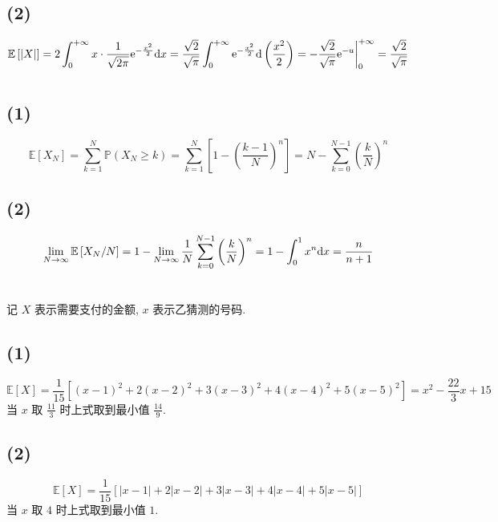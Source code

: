 \documentclass[8pt]{article}
\theoremstyle{compact}
\def\ge{\geqslant}
\def\P#1{\mathbb{P}\left({#1}\right)}
\def\e{\mathrm{e}}
\def\E#1{\mathbb{E}\left[{#1}\right]}
\begin{document}
\subsection*{(2)}
\begin{equation*}
	\E{|X|} = 2\int_{0}^{+\infty}x\cdot\frac{1}{\sqrt{2\pi}}\e^{-\frac{x^2}{2}}\text dx = \frac{\sqrt2}{\sqrt{\pi}}\int_{0}^{+\infty}\e^{-\frac{x^2}{2}}\text d\left(\frac{x^2}2\right) = -\frac{\sqrt2}{\sqrt{\pi}}\e^{-u}\bigg|_0^{+\infty} = \frac{\sqrt2}{\sqrt{\pi}}
\end{equation*}
\section{}
\subsection*{(1)}
\begin{equation*}
	\E{X_N} = \sum_{k=1}^{N}\P{X_N \ge k} = \sum_{k=1}^{N}\left[1 - \left(\frac {k-1}N\right)^n\right] = N - \sum_{k=0}^{N-1}\left(\frac kN\right)^n
\end{equation*}
\subsection*{(2)}
\begin{equation*}
	\lim_{N \to \infty}\E{X_N / N} = 1 - \lim_{N \to \infty}\frac1N\sum_{k=0}^{N-1}\left(\frac kN\right)^n = 1 - \int_{0}^{1}x^n\text dx = \frac{n}{n+1}
\end{equation*}
\section{}
记 $X$ 表示需要支付的金额, $x$ 表示乙猜测的号码.
\subsection*{(1)}
\begin{equation*}
	\E{X} = \frac{1}{15}\left[(x - 1)^2 + 2(x - 2)^2 + 3(x-3)^2 + 4(x - 4)^2 + 5(x - 5)^2\right] = x^2 - \frac{22}{3}x + 15
\end{equation*}
当 $x$ 取 $\frac{11}{3}$ 时上式取到最小值 $\frac{14}{9}$.
\subsection*{(2)}
\begin{equation*}
	\E{X} = \frac{1}{15}\left[|x - 1| + 2|x-2| + 3|x-3| + 4|x-4| + 5|x-5|\right]
\end{equation*}
当 $x$ 取 $4$ 时上式取到最小值 $1$.
\end{document}
